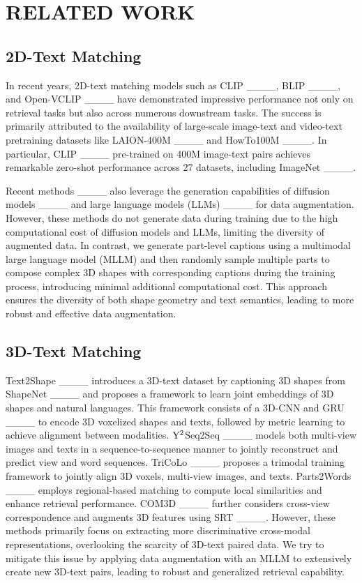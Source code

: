 \section{RELATED WORK}
\subsection{2D-Text Matching}
In recent years, 2D-text matching models such as CLIP ____, BLIP ____, and Open-VCLIP ____ have demonstrated impressive performance not only on retrieval tasks but also across numerous downstream tasks. The success is primarily attributed to the availability of large-scale image-text and video-text pretraining datasets like LAION-400M ____ and HowTo100M ____.
In particular, CLIP ____ pre-trained on 400M image-text pairs achieves remarkable zero-shot performance across 27 datasets, including ImageNet ____. 

Recent methods ____ also leverage the generation capabilities of diffusion models ____ and large language models (LLMs) ____ for data augmentation. However, these methods do not generate data during training due to the high computational cost of diffusion models and LLMs, limiting the diversity of augmented data.
In contrast, we generate part-level captions using a multimodal large language model (MLLM) and then randomly sample multiple parts to compose complex 3D shapes with corresponding captions during the training process, introducing minimal additional computational cost. This approach ensures the diversity of both shape geometry and text semantics, leading to more robust and effective data augmentation.



\subsection{3D-Text Matching}
Text2Shape ____ introduces a 3D-text dataset by captioning 3D shapes from ShapeNet ____ and proposes a framework to learn joint embeddings of 3D shapes and natural languages. This framework consists of a 3D-CNN and GRU ____ to encode 3D voxelized shapes and texts, followed by metric learning to achieve alignment between modalities. $\rm Y^{2}$Seq2Seq ____ models both multi-view images and texts in a sequence-to-sequence manner to jointly reconstruct and predict view and word sequences. TriCoLo ____ proposes a trimodal training framework to jointly align 3D voxels, multi-view images, and texts.
Parts2Words ____ employs regional-based matching to compute local similarities and enhance retrieval performance. COM3D ____ further considers cross-view correspondence and augments 3D features using SRT ____. However, these methods primarily focus on extracting more discriminative cross-modal representations, overlooking the scarcity of 3D-text paired data. We try to mitigate this issue by applying data augmentation with an MLLM to extensively create new 3D-text pairs, leading to robust and generalized retrieval capability.



